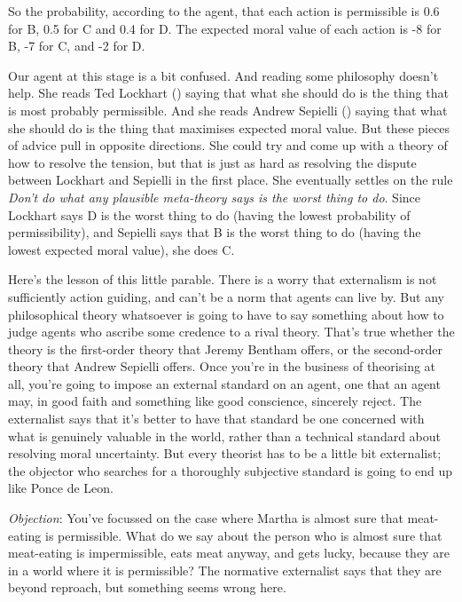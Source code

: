 \documentclass[
  10pt,
  letterpaper,
  DIV=11,
  numbers=noendperiod,
  twoside]{scrartcl}
\begin{document}
So the probability, according to the agent, that each action is
permissible is 0.6 for B, 0.5 for C and 0.4 for D. The expected moral
value of each action is -8 for B, -7 for C, and -2 for D.

Our agent at this stage is a bit confused. And reading some philosophy
doesn't help. She reads Ted Lockhart ()
saying that what she should do is the thing that is most probably
permissible. And she reads Andrew Sepielli
() saying that what she should do is
the thing that maximises expected moral value. But these pieces of
advice pull in opposite directions. She could try and come up with a
theory of how to resolve the tension, but that is just as hard as
resolving the dispute between Lockhart and Sepielli in the first place.
She eventually settles on the rule \emph{Don't do what any plausible
meta-theory says is the worst thing to do}. Since Lockhart says D is the
worst thing to do (having the lowest probability of permissibility), and
Sepielli says that B is the worst thing to do (having the lowest
expected moral value), she does C.

Here's the lesson of this little parable. There is a worry that
externalism is not sufficiently action guiding, and can't be a norm that
agents can live by. But any philosophical theory whatsoever is going to
have to say something about how to judge agents who ascribe some
credence to a rival theory. That's true whether the theory is the
first-order theory that Jeremy Bentham offers, or the second-order
theory that Andrew Sepielli offers. Once you're in the business of
theorising at all, you're going to impose an external standard on an
agent, one that an agent may, in good faith and something like good
conscience, sincerely reject. The externalist says that it's better to
have that standard be one concerned with what is genuinely valuable in
the world, rather than a technical standard about resolving moral
uncertainty. But every theorist has to be a little bit externalist; the
objector who searches for a thoroughly subjective standard is going to
end up like Ponce de Leon.

\emph{Objection}: You've focussed on the case where Martha is almost
sure that meat-eating is permissible. What do we say about the person
who is almost sure that meat-eating is impermissible, eats meat anyway,
and gets lucky, because they are in a world where it is permissible? The
normative externalist says that they are beyond reproach, but something
seems wrong here.
\end{document}
